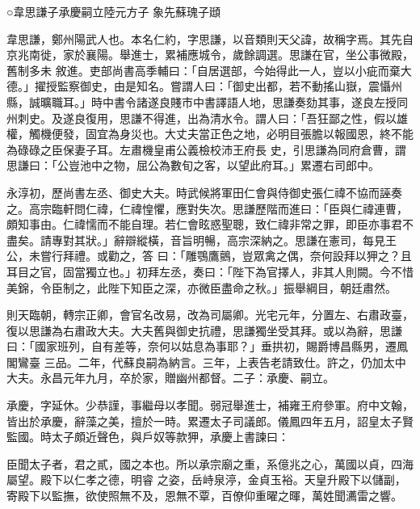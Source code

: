
\begin{pinyinscope}

 ○韋思謙子承慶嗣立陸元方子
 象先蘇瑰子頲



 韋思謙，鄭州陽武人也。本名仁約，字思謙，以音類則天父諱，故稱字焉。其先自京兆南徙，家於襄陽。舉進士，累補應城令，歲餘調選。思謙在官，坐公事微殿，舊制多未
 敘進。吏部尚書高季輔曰：「自居選部，今始得此一人，豈以小疵而棄大德。」擢授監察御史，由是知名。嘗謂人曰：「御史出都，若不動搖山嶽，震懾州縣，誠曠職耳。」時中書令諸遂良賤市中書譯語人地，思謙奏劾其事，遂良左授同州刺史。及遂良復用，思謙不得進，出為清水令。謂人曰：「吾狂鄙之性，假以雄權，觸機便發，固宜為身災也。大丈夫當正色之地，必明目張膽以報國恩，終不能為碌碌之臣保妻子耳。左肅機皇甫公義檢校沛王府長
 史，引思謙為同府倉曹，謂思謙曰：「公豈池中之物，屈公為數旬之客，以望此府耳。」累遷右司郎中。



 永淳初，歷尚書左丞、御史大夫。時武候將軍田仁會與侍御史張仁禕不協而誣奏之。高宗臨軒問仁禕，仁禕惶懼，應對失次。思謙歷階而進曰：「臣與仁禕連曹，頗知事由。仁禕懦而不能自理。若仁會眩惑聖聰，致仁禕非常之罪，即臣亦事君不盡矣。請專對其狀。」辭辯縱橫，音旨明暢，高宗深納之。思謙在憲司，每見王公，未嘗行拜禮。或勸之，答
 曰：「雕鶚鷹鸇，豈眾禽之偶，奈何設拜以狎之？且耳目之官，固當獨立也。」初拜左丞，奏曰：「陛下為官擇人，非其人則闕。今不惜美錦，令臣制之，此陛下知臣之深，亦微臣盡命之秋。」振舉綱目，朝廷肅然。



 則天臨朝，轉宗正卿，會官名改易，改為司屬卿。光宅元年，分置左、右肅政臺，復以思謙為右肅政大夫。大夫舊與御史抗禮，思謙獨坐受其拜。或以為辭，思謙曰：「國家班列，自有差等，奈何以姑息為事耶？」垂拱初，賜爵博昌縣男，遷鳳閣鸞臺
 三品。二年，代蘇良嗣為納言。三年，上表告老請致仕。許之，仍加太中大夫。永昌元年九月，卒於家，贈幽州都督。二子：承慶、嗣立。



 承慶，字延休。少恭謹，事繼母以孝聞。弱冠舉進士，補雍王府參軍。府中文翰，皆出於承慶，辭藻之美，擅於一時。累遷太子司議郎。儀鳳四年五月，詔皇太子賢監國。時太子頗近聲色，與戶奴等款狎，承慶上書諫曰：



 臣聞太子者，君之貳，國之本也。所以承宗廟之重，系億兆之心，萬國以貞，四海屬望。殿下以仁孝之德，明睿
 之姿，岳峙泉渟，金貞玉裕。天皇升殿下以儲副，寄殿下以監撫，欲使照無不及，恩無不覃，百僚仰重曜之暉，萬姓聞瀳雷之響。




\end{pinyinscope}

